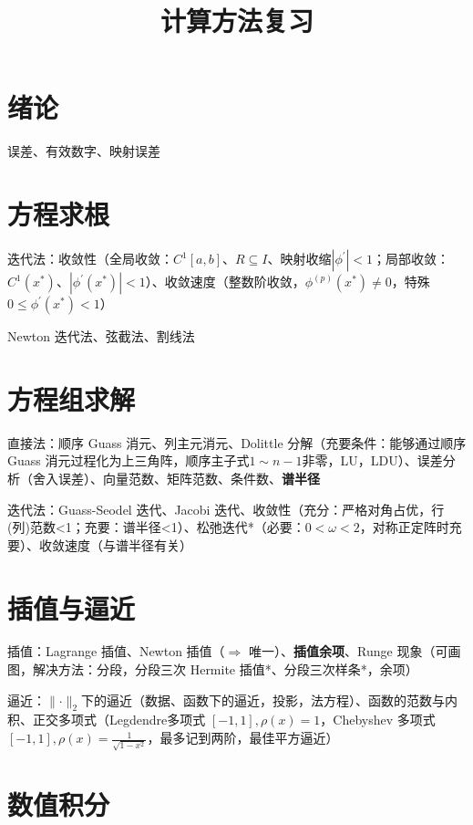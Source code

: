 \documentclass[twocolumn]{ctexart}
\title{计算方法复习}
\date{}
\begin{document}
\maketitle


\section{绪论}
误差、有效数字、映射误差

\section{方程求根}
迭代法：收敛性（全局收敛：$C^1[a,b]$、$R\subseteq I$、映射收缩$|\phi^\prime| <1$；局部收敛：$C^1(x^*)$、$|\phi^\prime(x^*)|<1$）、收敛速度（整数阶收敛，$\phi^{(p)}(x^*)\neq 0$，特殊$0\leq \phi^{\prime}(x^*)<1$）

Newton 迭代法、弦截法、割线法

\section{方程组求解}

直接法：顺序 Guass 消元、列主元消元、Dolittle 分解（充要条件：能够通过顺序 Guass 消元过程化为上三角阵，顺序主子式$1\sim n-1$非零，LU，LDU）、误差分析（舍入误差）、向量范数、矩阵范数、条件数、\textbf{谱半径}

迭代法：Guass-Seodel 迭代、Jacobi 迭代、收敛性（充分：严格对角占优，行(列)范数<1；充要：谱半径<1）、松弛迭代*（必要：$0<\omega<2$，对称正定阵时充要）、收敛速度（与谱半径有关）

\section{插值与逼近}

插值：Lagrange 插值、Newton 插值（$\Rightarrow$ 唯一）、\textbf{插值余项}、Runge 现象（可画图，解决方法：分段，分段三次 Hermite 插值*、分段三次样条*，余项）

逼近：$\lVert\cdot \rVert_2$下的逼近（数据、函数下的逼近，投影，法方程）、函数的范数与内积、正交多项式（Legdendre多项式 $[-1,1],\rho(x)=1$，Chebyshev 多项式 $[-1,1],\rho(x)=\frac{1}{\sqrt{1-x^2}}$，最多记到两阶，最佳平方逼近）

\section{数值积分}
\end{document}
